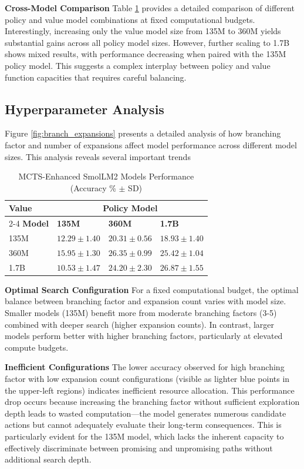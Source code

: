 \documentclass{article}
\begin{document}
\textbf{Cross-Model Comparison} Table \ref{tab:mcts-results} provides a detailed comparison of different policy and value model combinations at fixed computational budgets. Interestingly, increasing only the value model size from 135M to 360M yields substantial gains across all policy model sizes. However, further scaling to 1.7B shows mixed results, with performance decreasing when paired with the 135M policy model. This suggests a complex interplay between policy and value function capacities that requires careful balancing.

\subsection{Hyperparameter Analysis}
Figure \ref{fig:branch_expansions} presents a detailed analysis of how branching factor and number of expansions affect model performance across different model sizes. This analysis reveals several important trends

\begin{table}[h]
    \centering
    \caption{MCTS-Enhanced SmolLM2 Models Performance (Accuracy \% $\pm$ SD)}
    \label{tab:mcts-results}
    \begin{tabular}{p{2cm}p{3cm}p{3cm}p{3cm}}
        \toprule
        \textbf{Value} & \multicolumn{3}{c}{\textbf{Policy Model}} \\
        \cmidrule(lr){2-4}
        \textbf{Model} & \textbf{135M} & \textbf{360M} & \textbf{1.7B} \\
        \midrule
        135M   & $12.29 \pm 1.40$ & $20.31 \pm 0.56$ & $18.93 \pm 1.40$ \\
        360M   & $15.95 \pm 1.30$ & $26.35 \pm 0.99$ & $25.42 \pm 1.04$ \\
        1.7B   & $10.53 \pm 1.47$ & $24.20 \pm 2.30$ & $26.87 \pm 1.55$ \\
        \bottomrule
    \end{tabular}
\end{table}

\textbf{Optimal Search Configuration} For a fixed computational budget, the optimal balance between branching factor and expansion count varies with model size. Smaller models (135M) benefit more from moderate branching factors (3-5) combined with deeper search (higher expansion counts). In contrast, larger models perform better with higher branching factors, particularly at elevated compute budgets. 

\textbf{Inefficient Configurations} The lower accuracy observed for high branching factor with low expansion count configurations (visible as lighter blue points in the upper-left regions) indicates inefficient resource allocation. This performance drop occurs because increasing the branching factor without sufficient exploration depth leads to wasted computation—the model generates numerous candidate actions but cannot adequately evaluate their long-term consequences. This is particularly evident for the 135M model, which lacks the inherent capacity to effectively discriminate between promising and unpromising paths without additional search depth. 
\end{document}

